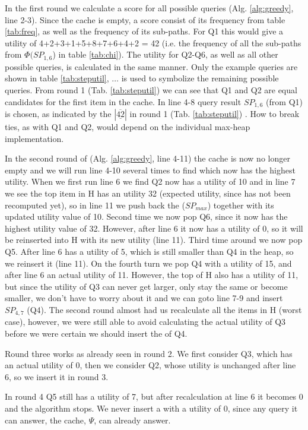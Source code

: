 In the first round we calculate a score for all possible queries (Alg. \ref{alg:greedy}, line 2-3). Since the cache is empty, a \spath score consist of its frequency from table \ref{tab:freq}, as well as the frequency of its sub-paths. For Q1 this would give a utility of 4+2+3+1+5+8+7+6+4+2 = 42 (i.e. the frequency of all the sub-paths from $\Phi(SP_{1,6}$) in table \ref{tab:chi}). The utility for Q2-Q6, as well as all other possible queries, is calculated in the same manner. Only the example queries are shown in table \ref{tab:steputil}, $\dots$ is used to symbolize the remaining possible queries. From round 1 (Tab. \ref{tab:steputil}) we can see that Q1 and Q2 are equal candidates for the first item in the cache. In line 4-8 query result $SP_{1,6}$ (from Q1) is chosen, as indicated by the $| \underline{\overline{42}}|$ in round 1 (Tab. \ref{tab:steputil}) . How to break ties, as with Q1 and Q2, would depend on the individual max-heap implementation. 

In the second round of \salgo (Alg. \ref{alg:greedy}, line 4-11) the cache is now no longer empty and we will run line 4-10 several times to find which \spath now has the highest utility. When we first run line 6 we find Q2 now has a utility of 10 and in line 7 we see the top item in H has an utility 32 (expected utility, since has not been recomputed yet), so in line 11 we push back the \spath ($SP_{max}$) together with its updated utility value of 10. Second time we now pop Q6, since it now has the highest utility value of 32. However, after line 6 it now has a utility of 0, so it will be reinserted into H with its new utility (line 11). Third time around we now pop Q5. After line 6 has a utility of 5, which is still smaller than Q4 in the heap, so we reinsert it (line 11). On the fourth turn we pop Q4 with a utility of 15, and after line 6 an actual utility of 11. However, the top of H also has a utility of 11, but since the utility of Q3 can never get larger, only stay the same or become smaller, we don't have to worry about it and we can goto line 7-9 and insert $SP_{4,7}$ (Q4). The second round almost had us recalculate all the items in H (worst case), however, we were still able to avoid calculating the actual utility of Q3 before we were certain we should insert the \spath of Q4.


Round three works as already seen in round 2. We first consider Q3, which has an actual utility of 0, then we consider Q2, whose utility is unchanged after line 6, so we insert it in round 3.

In round 4 Q5 still has a utility of 7, but after recalculation at line 6 it becomes 0 and the algorithm stops. We never insert a \spath with a utility of 0, since any query it can answer, the cache, $\Psi$, can already answer.

